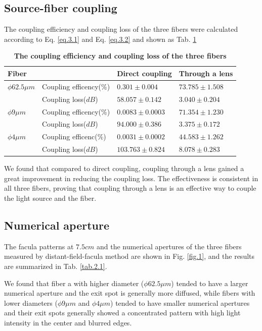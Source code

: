 \documentclass[10pt,a4paper,twocolumn,twoside,UTF8]{article}
\begin{document}
	\subsection{Source-fiber coupling}
	The coupling efficiency and coupling loss of the three fibers were calculated according to Eq. \ref{eq.3.1} and Eq. \ref{eq.3.2} and shown as Tab. \ref{tab.1.1}
	\begin{table}[htbp]
		\centering
			\begin{tabular}{llll}
				\toprule
				Fiber & ~ & Direct coupling & Through a lens \\
				\midrule
				$\phi 62.5\mu m$ & Coupling efficency(\%) & $0.301\pm0.004$ & $73.785\pm1.508$ \\
				~ & Coupling loss($dB$) & $58.057\pm0.142$ & $3.040\pm0.204$ \\
				\midrule
				$\phi 9\mu m$ & Coupling efficency(\%) & $0.0083\pm0.0003$ & $71.354\pm1.230$ \\
				~ & Coupling loss($dB$) & $94.000\pm0.386$ & $3.375\pm0.172$ \\
				\midrule
				$\phi 4\mu m$ & Coupling efficenc(\%) & $0.0031\pm0.0002$ & $44.583\pm1.262$ \\
				~ & Coupling loss($dB$) & $103.763\pm0.824$ & $8.078\pm0.283$ \\
				\bottomrule
			\end{tabular}
			\caption{\textbf{The coupling efficiency and coupling loss of the three fibers}}
			\label{tab.1.1}
	\end{table}
	We found that compared to direct coupling, coupling through a lens gained a great improvement in reducing the coupling loss.
	The effectiveness is consistent in all three fibers, proving that coupling through a lens is an effective way to couple the light source and the fiber.
	
	\subsection{Numerical aperture}
	The facula patterns at $7.5 cm$ and the numerical apertures of the three fibers measured by distant-field-facula method are shown in Fig. \ref{fig.1}, and the results are summarized in Tab. \ref{tab.2.1}.
	
	We found that fiber a with higher diameter ($\phi 62.5\mu m$) tended to have a larger numerical aperture and the exit spot is generally more diffused, 
	while fibers with lower diameters ($\phi 9\mu m$ and $\phi 4\mu m$) tended to have smaller numerical apertures and their exit spots generally showed a concentrated pattern with high light intensity in the center and blurred edges.
\end{document}
